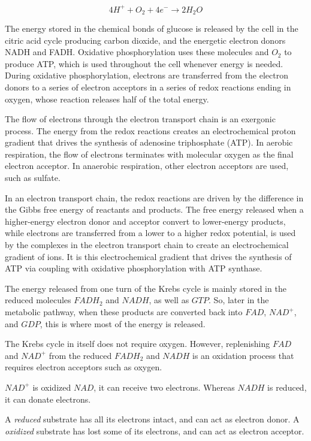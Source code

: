 \documentclass{article}
\begin{document}
\[
    4H^+ + O_2 + 4e^- \rightarrow 2H_2O
\]

The energy stored in the chemical bonds of glucose is released by the cell in the citric
acid cycle producing carbon dioxide, and the energetic electron donors NADH and FADH\@.
Oxidative phosphorylation uses these molecules and $O_2$ to produce ATP, which is used
throughout the cell whenever energy is needed. During oxidative phosphorylation, electrons
are transferred from the electron donors to a series of electron acceptors in a series of
redox reactions ending in oxygen, whose reaction releases half of the total energy.

The flow of electrons through the electron transport chain is an exergonic process. The
energy from the redox reactions creates an electrochemical proton gradient that drives the
synthesis of adenosine triphosphate (ATP). In aerobic respiration, the flow of electrons
terminates with molecular oxygen as the final electron acceptor. In anaerobic respiration,
other electron acceptors are used, such as sulfate.

In an electron transport chain, the redox reactions are driven by the difference in the
Gibbs free energy of reactants and products. The free energy released when a higher-energy
electron donor and acceptor convert to lower-energy products, while electrons are
transferred from a lower to a higher redox potential, is used by the complexes in the
electron transport chain to create an electrochemical gradient of ions. It is this
electrochemical gradient that drives the synthesis of ATP via coupling with oxidative
phosphorylation with ATP synthase.

The energy released from one turn of the Krebs cycle is mainly stored in the reduced
molecules $FADH_2$ and $NADH$, as well as $GTP$. So, later in the metabolic pathway, when
these products are converted back into $FAD$, $NAD^+$, and $GDP$, this is where most of
the energy is released.

The Krebs cycle in itself does not require oxygen. However, replenishing $FAD$ and $NAD^+$
from the reduced $FADH_2$ and $NADH$ is an oxidation process that requires electron
acceptors such as oxygen.

$NAD^+$ is oxidized $NAD$, it can receive two electrons.
Whereas $NADH$ is reduced, it can donate electrons.

A {\em reduced\/} substrate has all its electrons intact, and can act as electron donor.
A {\em oxidized\/} substrate has lost some of its electrons, and can act as electron
acceptor.
\end{document}
